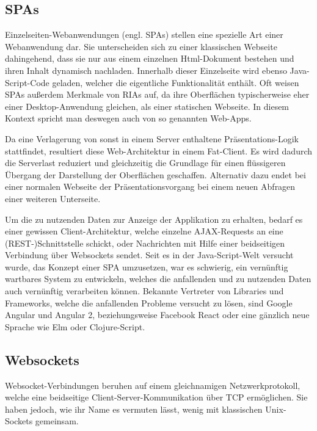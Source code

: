 \subsection{\aclp{SPA}}
Einzelseiten-Webanwendungen (engl. \aclp{SPA}) stellen eine spezielle Art einer Webanwendung dar.
Sie unterscheiden sich zu einer klassischen Webseite dahingehend, dass sie nur aus einem einzelnen Html-Dokument bestehen und ihren Inhalt dynamisch nachladen.
Innerhalb dieser Einzelseite wird ebenso Java-Script-Code geladen, welcher die eigentliche Funktionalität enthält.
Oft weisen \acp{SPA} außerdem Merkmale von \acp{RIA} auf, da ihre Oberflächen typischerweise eher einer Desktop-Anwendung gleichen, als einer statischen Webseite. In diesem Kontext spricht man deswegen auch von so genannten Web-Apps.
\par
Da eine Verlagerung von sonst in einem Server enthaltene Präsentations-Logik stattfindet, resultiert diese Web-Architektur in einem Fat-Client.
Es wird dadurch die Serverlast reduziert und gleichzeitig die Grundlage für einen flüssigeren Übergang der Darstellung der Oberflächen geschaffen.
Alternativ dazu endet bei einer normalen Webseite der Präsentationsvorgang bei einem neuen Abfragen einer weiteren Unterseite.
\par
Um die zu nutzenden Daten zur Anzeige der Applikation zu erhalten, bedarf es einer gewissen Client-Architektur, welche einzelne \ac{AJAX}-Requests an eine (\ac{REST}-)Schnittstelle schickt, oder Nachrichten mit Hilfe einer beidseitigen Verbindung über Websockets sendet.
Seit es in der Java-Script-Welt versucht wurde, das Konzept einer \ac{SPA} umzusetzen, war es schwierig, ein vernünftig wartbares System zu entwickeln, welches die anfallenden und zu nutzenden Daten auch vernünftig verarbeiten können.
Bekannte Vertreter von Libraries und Frameworks, welche die anfallenden Probleme versucht zu lösen, sind Google Angular und Angular 2, beziehungsweise Facebook React oder eine gänzlich neue Sprache wie Elm oder Clojure-Script.
\subsection{Websockets}
Websocket-Verbindungen beruhen auf einem gleichnamigen Netzwerkprotokoll, welche eine beidseitige Client-Server-Kommunikation über \ac{TCP} ermöglichen.
Sie haben jedoch, wie ihr Name es vermuten lässt, wenig mit klassischen Unix-Sockets gemeinsam.

